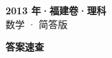 \documentclass[zihao=-4, a4paper]{ctexart}
\begin{document}
\begin{center}
  {\Large\bfseries 2013 年·福建卷·理科}\\[4pt]
  {\large 数学 · 简答版}
\end{center}
\medskip
{}

\clearpage
{}
\begin{center}{\Large\bfseries 答案速查}\end{center}
\medskip

\end{document}
